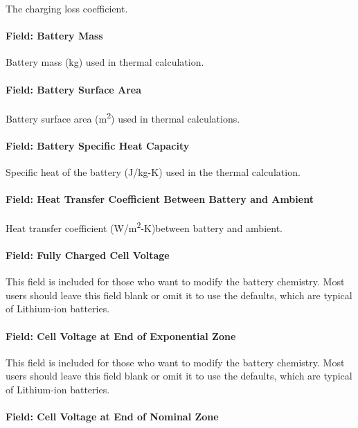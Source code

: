 The charging loss coefficient.

\paragraph{Field: Battery Mass}\label{liion-mass}

Battery mass (kg) used in thermal calculation.

\paragraph{Field: Battery Surface Area}\label{liion-surf-area}

Battery surface area (m\textsuperscript{2}) used in thermal calculations.

\paragraph{Field: Battery Specific Heat Capacity}\label{liion-cp}

Specific heat of the battery (J/kg-K) used in the thermal calculation.

\paragraph{Field: Heat Transfer Coefficient Between Battery and Ambient}\label{liion-h}

Heat transfer coefficient (W/m\textsuperscript{2}-K)between battery and ambient.

\paragraph{Field: Fully Charged Cell Voltage}\label{liion-vfull}

This field is included for those who want to modify the battery chemistry. Most users should leave this field blank or omit it to use the defaults, which are typical of Lithium-ion batteries.

\paragraph{Field: Cell Voltage at End of Exponential Zone}\label{liion-vexp}

This field is included for those who want to modify the battery chemistry. Most users should leave this field blank or omit it to use the defaults, which are typical of Lithium-ion batteries.

\paragraph{Field: Cell Voltage at End of Nominal Zone}\label{liion-vnom}

